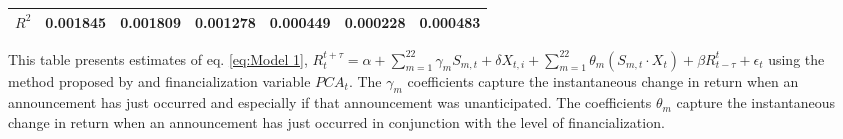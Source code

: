\begin{sidewaystable}
{\begin{tabular}{@{}lllllllllllll@{}}
                 \\ \textbf{$R^2$}             &\multicolumn{2}{c}{ 0.001845 }                                                 & \multicolumn{2}{c}{ 0.001809 }                                                 & \multicolumn{2}{c}{ 0.001278 }                                                 & \multicolumn{2}{c}{ 0.000449 }                                                 & \multicolumn{2}{c}{ 0.000228 }                                                   & \multicolumn{2}{c}{ 0.000483 }                                                 \\ \bottomrule 
\end{tabular}
}
\begin{tablenotes}\item 
    \singlespacing
    \footnotesize
    This table presents estimates of eq. \ref{eq:Model 1}, $R_{t}^{t+\tau}=\alpha+\sum_{m=1}^{22} \gamma_m S_{m,t}+ \delta X_{t,i} + \sum_{m=1}^{22} \theta_m (S_{m,t} \cdot X_t)+\beta R_{t-\tau}^{t}+\epsilon_{t}$ using the method proposed by \citet{kurov2019price} and financialization variable $PCA_t$. The $\gamma_m$ coefficients capture the instantaneous change in return when an announcement has just occurred and especially if that announcement was unanticipated. The coefficients $\theta_m$ capture the instantaneous change in return when an announcement has just occurred in conjunction with the level of financialization.
\end{tablenotes}
\end{sidewaystable}

